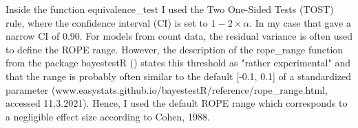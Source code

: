 Inside the function equivalence\_test I used the Two One-Sided Tests (TOST) rule, where the confidence interval (CI) is set to $1 - 2\times \alpha$. In my case that gave a narrow CI of 0.90.
For models from count data, the residual variance is often used to define the ROPE range. However, the description of the rope\_range function from the package bayestestR () states this threshold as "rather experimental" and that the range is probably often similar to the default [-0.1, 0.1] of a standardized parameter (www.easystats.github.io/bayestestR/reference/rope\_range.html, accessed 11.3.2021). %
Hence, I used the default ROPE range which corresponds to a negligible effect size according to Cohen, 1988.











